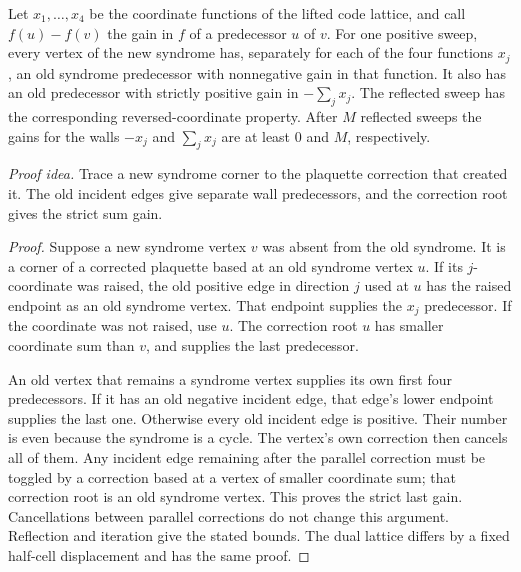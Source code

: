 \begin{lemma}\label{q:sweep}
Let \(x_1,\ldots,x_4\) be the coordinate functions of the lifted code lattice, and call \(f(u)-f(v)\) the gain in \(f\) of a predecessor \(u\) of \(v\). For one positive sweep, every vertex of the new syndrome has, separately
for each of the four functions \(x_j\), an old syndrome predecessor with
nonnegative gain in that function. It also has an old predecessor with
strictly positive gain in \(-\sum_jx_j\). The reflected sweep has the
corresponding reversed-coordinate property. After \(M\) reflected
sweeps the gains for the walls \(-x_j\) and \(\sum_jx_j\) are at least
\(0\) and \(M\), respectively.
\end{lemma}
\par\noindent\emph{Proof idea.} Trace a new syndrome corner to the plaquette correction that created it. The old incident edges give separate wall predecessors, and the correction root gives the strict sum gain.

\begin{proof}
Suppose a new syndrome vertex \(v\) was absent from the old syndrome.
It is a corner of a corrected plaquette based at an old syndrome vertex
\(u\). If its \(j\)-coordinate was raised, the old positive edge in
direction \(j\) used at \(u\) has the raised endpoint as an old syndrome
vertex. That endpoint supplies the \(x_j\) predecessor. If the coordinate
was not raised, use \(u\). The correction root \(u\) has smaller
coordinate sum than \(v\), and supplies the last predecessor.

An old vertex that remains a syndrome vertex supplies its own first
four predecessors. If it has an old negative incident edge, that
edge's lower endpoint supplies the last one. Otherwise every old
incident edge is positive. Their number is even because the syndrome
is a cycle. The vertex's own correction then cancels all of them.
Any incident edge remaining after the parallel correction must be
toggled by a correction based at a vertex of smaller coordinate sum;
that correction root is an old syndrome vertex. This proves the strict
last gain. Cancellations between parallel corrections do not change
this argument. Reflection and iteration give the stated bounds. The
dual lattice differs by a fixed half-cell displacement and has the
same proof.
\end{proof}

